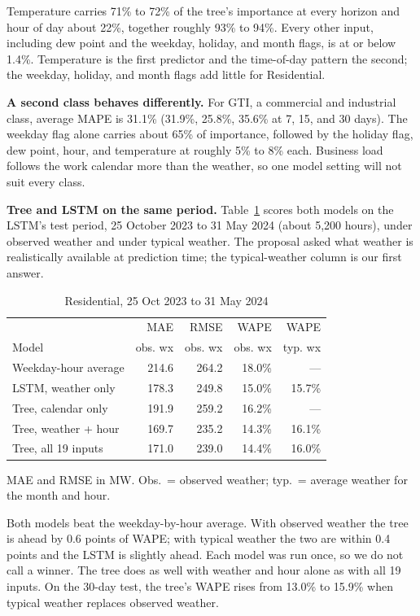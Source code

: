 \documentclass[10pt,letterpaper,twocolumn]{article}
\begin{document}
Temperature carries 71\% to 72\% of the tree's importance at every horizon and hour of day about 22\%, together roughly 93\% to 94\%. Every other input, including dew point and the weekday, holiday, and month flags, is at or below 1.4\%. Temperature is the first predictor and the time-of-day pattern the second; the weekday, holiday, and month flags add little for Residential.

\textbf{A second class behaves differently.} For GTI, a commercial and industrial class, average MAPE is 31.1\% (31.9\%, 25.8\%, 35.6\% at 7, 15, and 30 days). The weekday flag alone carries about 65\% of importance, followed by the holiday flag, dew point, hour, and temperature at roughly 5\% to 8\% each. Business load follows the work calendar more than the weather, so one model setting will not suit every class.

\textbf{Tree and LSTM on the same period.} Table~\ref{tab:compare} scores both models on the LSTM's test period, 25 October 2023 to 31 May 2024 (about 5,200 hours), under observed weather and under typical weather. The proposal asked what weather is realistically available at prediction time; the typical-weather column is our first answer.

\begin{table}[t]
\caption{Residential, 25 Oct 2023 to 31 May 2024}
\label{tab:compare}
\centering\footnotesize
\setlength{\tabcolsep}{3pt}
\begin{tabular}{@{}lrrrr@{}}
\toprule
 & MAE & RMSE & WAPE & WAPE \\
Model & obs. wx & obs. wx & obs. wx & typ. wx \\
\midrule
Weekday-hour average & 214.6 & 264.2 & 18.0\% & --- \\
LSTM, weather only & 178.3 & 249.8 & 15.0\% & 15.7\% \\
Tree, calendar only & 191.9 & 259.2 & 16.2\% & --- \\
Tree, weather + hour & 169.7 & 235.2 & 14.3\% & 16.1\% \\
Tree, all 19 inputs & 171.0 & 239.0 & 14.4\% & 16.0\% \\
\bottomrule
\end{tabular}
\par\smallskip\noindent MAE and RMSE in MW. Obs.\ = observed weather; typ.\ = average weather for the month and hour.
\end{table}

Both models beat the weekday-by-hour average. With observed weather the tree is ahead by 0.6 points of WAPE; with typical weather the two are within 0.4 points and the LSTM is slightly ahead. Each model was run once, so we do not call a winner. The tree does as well with weather and hour alone as with all 19 inputs. On the 30-day test, the tree's WAPE rises from 13.0\% to 15.9\% when typical weather replaces observed weather.
\end{document}
